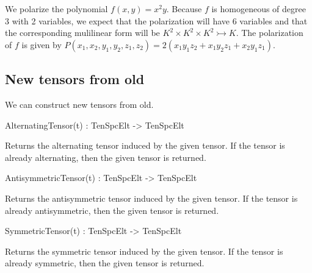 \begin{example}[TensorPolarization]
We polarize the polynomial $f(x,y)=x^2y$. 
Because $f$ is homogeneous of degree 3 with 2 variables, we expect that the polarization will have 6 variables and that the corresponding mulilinear form will be $K^2\times K^2\times K^2\rightarrowtail K$.
The polarization of $f$ is given by $P(x_1,x_2,y_1,y_2,z_1,z_2 ) = 2 (x_1y_1z_2 + x_1y_2z_1 + x_2y_1z_1)$.

\end{example}




\subsection{New tensors from old}
We can construct new tensors from old.

\begin{intrinsics}
AlternatingTensor(t) : TenSpcElt -> TenSpcElt
\end{intrinsics}

Returns the alternating tensor induced by the given tensor. If 
the tensor is already alternating, then the given tensor is returned.

\begin{intrinsics}
AntisymmetricTensor(t) : TenSpcElt -> TenSpcElt
\end{intrinsics}

Returns the antisymmetric tensor induced by the given tensor. If 
the tensor is already antisymmetric, then the given tensor is returned.

\begin{intrinsics}
SymmetricTensor(t) : TenSpcElt -> TenSpcElt
\end{intrinsics}

Returns the symmetric tensor induced by the given tensor. If the tensor is 
already symmetric, then the given tensor is returned.

